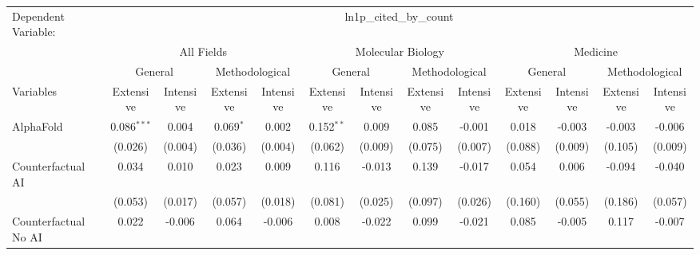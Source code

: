 \begingroup
\centering
\begin{tabular}{lcccccccccccc}
   \tabularnewline \midrule \midrule
   Dependent Variable: & \multicolumn{12}{c}{ln1p\_cited\_by\_count}\\
 & \multicolumn{4}{c}{All Fields} & \multicolumn{4}{c}{Molecular Biology} & \multicolumn{4}{c}{Medicine} \\
\cmidrule(lr){2-5} \cmidrule(lr){6-9} \cmidrule(lr){10-13}
 & \multicolumn{2}{c}{General} & \multicolumn{2}{c}{Methodological} & \multicolumn{2}{c}{General} & \multicolumn{2}{c}{Methodological} & \multicolumn{2}{c}{General} & \multicolumn{2}{c}{Methodological} \\
\cmidrule(lr){2-3} \cmidrule(lr){4-5} \cmidrule(lr){6-7} \cmidrule(lr){8-9} \cmidrule(lr){10-11} \cmidrule(lr){12-13}
Variables & \multicolumn{1}{c}{Extensive} & \multicolumn{1}{c}{Intensive} & \multicolumn{1}{c}{Extensive} & \multicolumn{1}{c}{Intensive} & \multicolumn{1}{c}{Extensive} & \multicolumn{1}{c}{Intensive} & \multicolumn{1}{c}{Extensive} & \multicolumn{1}{c}{Intensive} & \multicolumn{1}{c}{Extensive} & \multicolumn{1}{c}{Intensive} & \multicolumn{1}{c}{Extensive} & \multicolumn{1}{c}{Intensive} \\
\cmidrule(lr){1-1}\cmidrule(lr){2-2} \cmidrule(lr){3-3} \cmidrule(lr){4-4} \cmidrule(lr){5-5} \cmidrule(lr){6-6} \cmidrule(lr){7-7} \cmidrule(lr){8-8} \cmidrule(lr){9-9} \cmidrule(lr){10-10} \cmidrule(lr){11-11} \cmidrule(lr){12-12} \cmidrule(lr){13-13}
   AlphaFold                                & 0.086$^{***}$ & 0.004    & 0.069$^{*}$   & 0.002    & 0.152$^{**}$ & 0.009    & 0.085         & -0.001   & 0.018   & -0.003   & -0.003  & -0.006\\   
                                            & (0.026)       & (0.004)  & (0.036)       & (0.004)  & (0.062)      & (0.009)  & (0.075)       & (0.007)  & (0.088) & (0.009)  & (0.105) & (0.009)\\   
   Counterfactual AI                        & 0.034         & 0.010    & 0.023         & 0.009    & 0.116        & -0.013   & 0.139         & -0.017   & 0.054   & 0.006    & -0.094  & -0.040\\   
                                            & (0.053)       & (0.017)  & (0.057)       & (0.018)  & (0.081)      & (0.025)  & (0.097)       & (0.026)  & (0.160) & (0.055)  & (0.186) & (0.057)\\   
   Counterfactual No AI                     & 0.022         & -0.006   & 0.064         & -0.006   & 0.008        & -0.022   & 0.099         & -0.021   & 0.085   & -0.005   & 0.117   & -0.007\\   

\end{tabular}
